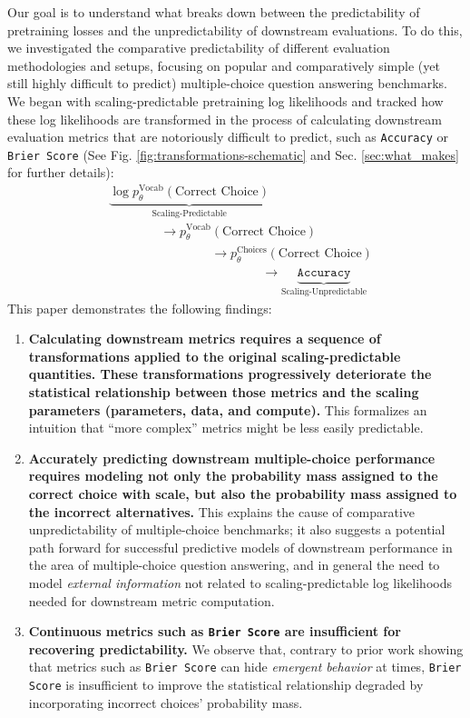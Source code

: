 Our goal is to understand what breaks down between the predictability of pretraining losses and the unpredictability of downstream evaluations. To do this, we investigated the comparative predictability of different evaluation methodologies and setups, focusing on popular and comparatively simple (yet still highly difficult to predict) multiple-choice question answering benchmarks. 
We began with scaling-predictable pretraining log likelihoods %
and tracked how these log likelihoods are transformed in the process of calculating downstream evaluation metrics that are notoriously difficult to predict, such as \texttt{Accuracy} or \texttt{Brier Score} (See Fig. \ref{fig:transformations-schematic} and Sec. \ref{sec:what_makes} for further details):
%
\begin{equation*}
\begin{aligned}
    &\underbrace{\log p_{\theta}^{\text{Vocab}}(\text{Correct Choice})}_{\text{Scaling-Predictable}}\\
    &\quad\quad\quad\quad \rightarrow p_{\theta}^{\text{Vocab}}(\text{Correct Choice})\\
    &\quad\quad\quad\quad\quad\quad\quad\quad \rightarrow p_{\theta}^{\text{Choices}}(\text{Correct Choice})\\
    &\quad\quad\quad\quad\quad\quad\quad\quad\quad\quad\quad\quad \rightarrow \underbrace{\texttt{Accuracy}}_{\text{Scaling-Unpredictable}}
\end{aligned}
\end{equation*}
%
This paper demonstrates the following findings:
%
\begin{enumerate}
    \item \textbf{Calculating downstream metrics requires a sequence of transformations applied to the original scaling-predictable quantities. These transformations progressively deteriorate the statistical relationship between those metrics and the scaling parameters (parameters, data, and compute).} This formalizes an intuition that ``more complex'' metrics might be less easily predictable.
    \item 
    \textbf{Accurately predicting downstream multiple-choice performance requires modeling not only the probability mass assigned to the correct choice with scale, but also the probability mass assigned to the incorrect alternatives.} This explains the cause of comparative unpredictability of multiple-choice benchmarks; it also suggests a potential path forward for successful predictive models of downstream performance in the area of multiple-choice question answering, and in general the need to model \textit{external information} not related to scaling-predictable log likelihoods needed for downstream metric computation.
    \item \textbf{Continuous metrics such as \texttt{Brier Score} are insufficient for recovering predictability.} We observe that, contrary to prior work showing that metrics such as \texttt{Brier Score} can hide \textit{emergent behavior} at times, \texttt{Brier Score} is insufficient to improve the statistical relationship degraded by incorporating incorrect choices' probability mass.
\end{enumerate}

